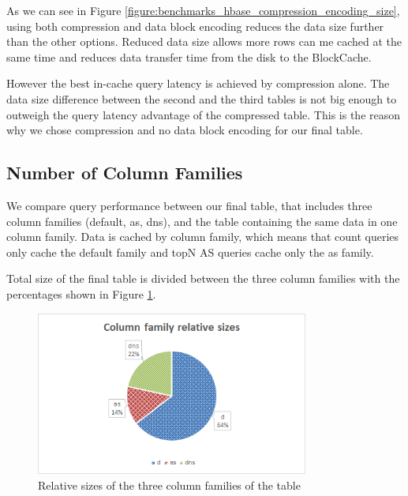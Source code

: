 As we can see in Figure \ref{figure:benchmarks_hbase_compression_encoding_size}, using both compression and data block encoding reduces the data size further than the other options. Reduced data size allows more rows can me cached at the same time and reduces data transfer time from the disk to the BlockCache.

However the best in-cache query latency is achieved by compression alone. The data size difference between the second and the third tables is not big enough to outweigh the query latency advantage of the compressed table. This is the reason why we chose compression and no data block encoding for our final table.

\subsection{Number of Column Families}

We compare query performance between our final table, that includes three column families (default, as, dns), and the table containing the same data in one column family. Data is cached by column family, which means that count queries only cache the default family and topN AS queries cache only the as family.

Total size of the final table is divided between the three column families with the percentages shown in Figure \ref{figure:benchmarks_hbase_cf_sizes}.

\begin{figure}[H]
\centering
\includegraphics[width=0.8\textwidth]{figures/benchmarks_hbase_cf_sizes}
\caption{Relative sizes of the three column families of the table}
\label{figure:benchmarks_hbase_cf_sizes}
\end{figure}

